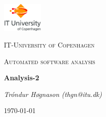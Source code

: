 
\begin{titlepage}
	\centering
	\includegraphics[width=0.15\textwidth]{logo}\par\vspace{1cm}
	{\scshape\LARGE IT-University of Copenhagen \par}
	\vspace{1cm}
	{\scshape\Large Automated software analysis\par}
	\vspace{1.5cm}
	{\huge\bfseries Analysis-2\par}
	\vspace{2cm}
	{\Large\itshape Tróndur Høgnason (thgn@itu.dk)\par}
\vspace{\fill}
	{\large \today\par}
\end{titlepage}